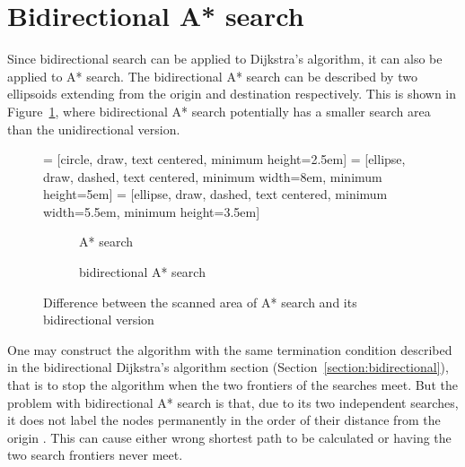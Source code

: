 \section{Bidirectional A* search}
Since bidirectional search can be applied to Dijkstra's algorithm,
it can also be applied to A* search.
The bidirectional A* search can be described by two ellipsoids extending from the origin and destination respectively.
This is shown in Figure~\ref{fig:bidirectdiff},
where bidirectional A* search potentially has a smaller search area than the unidirectional version.

\begin{figure}[b]
     = [circle, draw, text centered, minimum height=2.5em]
     = [ellipse, draw, dashed, text centered, minimum width=8em, minimum height=5em]
     = [ellipse, draw, dashed, text centered, minimum width=5.5em, minimum height=3.5em]
    \centering
    \begin{subfigure}[t]{.4\textwidth}
        \centering
        \caption{A* search}
    \end{subfigure}
    \begin{subfigure}[t]{.4\textwidth}
        \centering
        \caption{bidirectional A* search}
    \end{subfigure}
    \caption{Difference between the scanned area of A* search and its bidirectional version}
    \label{fig:bidirectdiff}
\end{figure}

One may construct the algorithm with the same termination condition described in the bidirectional Dijkstra's algorithm section (Section~\ref{section:bidirectional}),
that is to stop the algorithm when the two frontiers of the searches meet.
But the problem with bidirectional A* search is that, due to its two independent searches,
it does not label the nodes permanently in the order of their distance from the origin \citep{Klunder}.
This can cause either wrong shortest path to be calculated or having the two search frontiers never meet.

